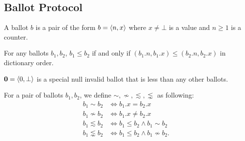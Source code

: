 \subsection{Ballot Protocol}

\begin{defn}[Ballot]
    A ballot $b$ is a pair of the form $b = \ev{n, x}$ where $x \ne \bot$ is a value and $n \geq 1$ is a counter.
\end{defn}

\begin{defn}[Order]
    For any ballots $b_1, b_2$, $b_1 \leq b_2$ if and only if $(b_1.n, b_1.x) \leq (b_2.n, b_2.x)$ in dictionary order.
\end{defn}

\begin{defn}
    $\textbf{0} = \ev{0, \bot}$ is a special null invalid ballot that is less than any other ballots.
\end{defn}

\begin{defn}[Compatability]
    For a pair of ballots $b_1, b_2$, we define $\sim, \nsim, \lesssim, \lnsim$ as following:
    \begin{align*}
        b_1 \sim b_2 &\iff b_1.x = b_2.x \\
        b_1 \nsim b_2 &\iff b_1.x \ne b_2.x \\
        b_1 \lesssim b_2 &\iff b_1 \leq b_2 \land b_1 \sim b_2 \\
        b_1 \lnsim b_2 &\iff b_1 \leq b_2 \land b_1 \nsim b_2.
    \end{align*}
\end{defn}

